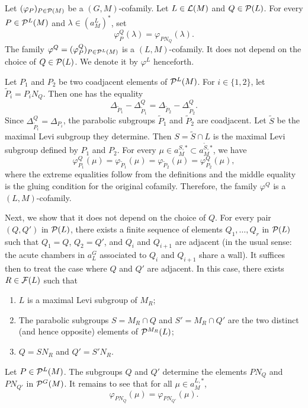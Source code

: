 \begin{paragr}
\begin{lemme}\label{lem:indpceQ}
Let $(\varphi_P)_{P\in \mathcal{P}(M)}$ be a $(G,M)$-cofamily. Let $L\in \mathcal{L}(M)$ and  $Q\in \mathcal{P}(L)$. For every $P\in \mathcal{P}^L(M)$ and $\lambda\in (a_M^L)^*$, set
$$\varphi^Q_P(\lambda)=\varphi_{PN_Q}(\lambda).$$
The family $\varphi^Q=(\varphi^Q_P)_{P\in \mathcal{P}^L(M)}$ is a $(L,M)$-cofamily. It does not depend on the choice of $Q\in \mathcal{P}(L)$. We denote it by $\varphi^L$ henceforth.
\end{lemme}

\begin{preuve}
Let $P_1$ and $P_2$ be two coadjacent elements of $\mathcal{P}^L(M)$. For $i\in \{1,2\}$, let $\tilde{P}_i=P_i N_Q$. Then one has the equality 
$$\Delta_{\tilde{P}_1}-\Delta_{\tilde{P}_1}^Q=\Delta_{\tilde{P}_2}-\Delta_{\tilde{P}_2}^Q.$$
Since $\Delta_{\tilde{P}_i}^Q=\Delta_{P_i}$, the parabolic subgroups $\tilde{P}_1$ and $\tilde{P}_2$ are coadjacent. Let $\tilde{S}$ be the maximal Levi subgroup they determine. Then $S=\tilde{S} \cap L$ is the maximal Levi subgroup defined by $P_1$ and $P_2$. For every $\mu\in a_M^{S,*}\subset a_M^{\tilde{S},*}$, we have 
$$\varphi^Q_{P_1}(\mu)=\varphi_{\tilde{P}_1}(\mu)=\varphi_{\tilde{P}_2}(\mu)=\varphi^Q_{P_2}(\mu),$$
where the extreme equalities follow from the definitions and the middle equality is the gluing condition for the original cofamily. Therefore, the family $\varphi^Q$ is a $(L,M)$-cofamily.

Next, we show that it does not depend on the choice of $Q$. For every pair $(Q,Q')$ in $\mathcal{P}(L)$, there exists a finite sequence of elements $Q_1,\ldots,Q_r$ in $\mathcal{P}(L)$ such that $Q_1=Q$, $Q_2=Q'$, and $Q_i$ and $Q_{i+1}$ are adjacent (in the usual sense: the acute chambers in $a_L^G$ associated to $Q_i$ and $Q_{i+1}$ share a wall). It suffices then to treat the case where $Q$ and $Q'$ are adjacent. In this case, there exists $R\in \mathcal{F}(L)$ such that 
\begin{enumerate}
\item $L$ is a maximal Levi subgroup of $M_R$;
\item The parabolic subgroups $S=M_R\cap Q$ and $S'=M_R\cap Q'$ are the two distinct (and hence opposite) elements of $\mathcal{P}^{M_R}(L)$;
\item $Q=SN_R$ and $Q'=S'N_R$.
\end{enumerate}
Let $P\in \mathcal{P}^L(M)$. The subgroups $Q$ and $Q'$ determine the elements $PN_Q$ and $PN_{Q'}$ in $\mathcal{P}^G(M)$. It remains to see that for all $\mu\in a_M^{L,*}$,
\begin{equation}
  \label{eq:avoir}
  \varphi_{PN_Q}(\mu)=\varphi_{PN_{Q'}}(\mu).
\end{equation}


\end{preuve}
\end{paragr}
